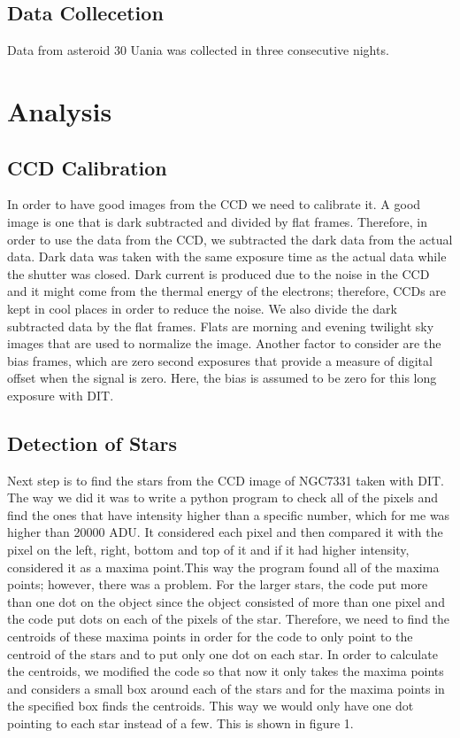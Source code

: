 \documentclass[letterpaper,12pt]{article}
\begin{document}
\subsection{Data Collecetion}
Data from asteroid 30 Uania was collected in three consecutive nights.


\section{Analysis}
\label{analysis}
\subsection{CCD Calibration}
In order to have good images from the CCD we need to calibrate it. A good image is one that is dark subtracted and divided by flat frames. Therefore, in order to use the data from the CCD, we subtracted the dark data from the actual data. Dark data was taken with the same exposure time as the actual data while  the shutter was closed. Dark current is produced due to the noise in the CCD and it might come from the thermal energy of the electrons; therefore, CCDs are kept in cool places in order to reduce the noise. We also divide the dark subtracted data by the flat frames. Flats are morning and evening twilight sky images that are used to normalize the image. Another factor to consider are the bias frames, which are zero second exposures that provide a measure of digital offset when the signal is zero. Here, the bias is assumed to be zero for this long exposure with DIT.




\subsection{Detection of Stars}
Next step is to find the stars from the CCD image of NGC7331 taken with DIT. The way we did it was to write a python program to check all of the pixels and find the ones that have intensity higher than a specific number, which for me was higher than 20000 ADU. It considered each pixel and then compared it with the pixel on the left, right, bottom and top of it and if it had higher intensity, considered it as a maxima point.This way the program found all of the maxima points; however, there was a problem. For the larger stars, the code put more than one dot on the object since the object consisted of more than one pixel and the code put dots on each of the pixels of the star. Therefore, we need to find the centroids of these maxima points in order for the code to only point to the centroid of the stars and to put only one dot on each star. In order to calculate the centroids, we modified the code so that now it only takes the maxima points and considers a small box around each of the stars and for the maxima points in the specified box finds the centroids. This way we would only have one dot pointing to each star instead of a few. This is shown in figure 1.
\end{document}
